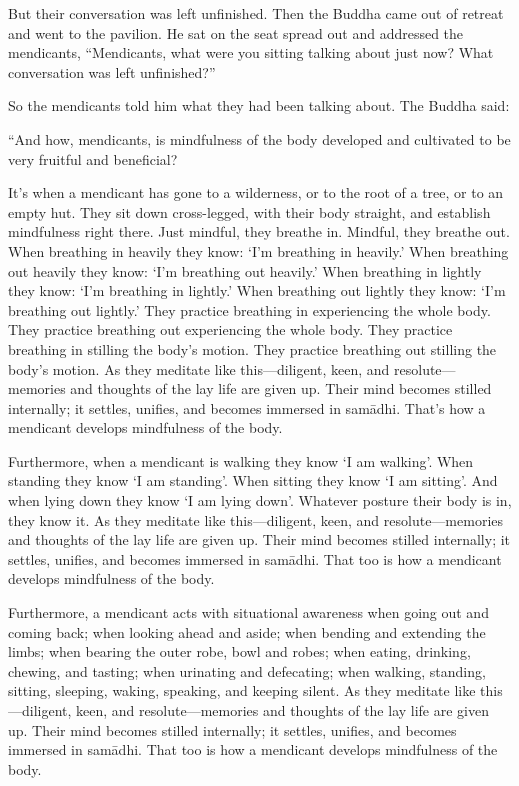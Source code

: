 \documentclass[12pt,openany]{book}%
\begin{document}
But their conversation was left unfinished. Then the Buddha came out of retreat and went to the pavilion. He sat on the seat spread out and addressed the mendicants, “Mendicants, what were you sitting talking about just now? What conversation was left unfinished?” 

So the mendicants told him what they had been talking about. The Buddha said: 

“And how, mendicants, is mindfulness of the body developed and cultivated to be very fruitful and beneficial? 

It’s when a mendicant has gone to a wilderness, or to the root of a tree, or to an empty hut. They sit down cross-legged, with their body straight, and establish mindfulness right there. Just mindful, they breathe in. Mindful, they breathe out. When breathing in heavily they know: ‘I’m breathing in heavily.’ When breathing out heavily they know: ‘I’m breathing out heavily.’ When breathing in lightly they know: ‘I’m breathing in lightly.’ When breathing out lightly they know: ‘I’m breathing out lightly.’ They practice breathing in experiencing the whole body. They practice breathing out experiencing the whole body. They practice breathing in stilling the body’s motion. They practice breathing out stilling the body’s motion. As they meditate like this—diligent, keen, and resolute—memories and thoughts of the lay life are given up. Their mind becomes stilled internally; it settles, unifies, and becomes immersed in \textsanskrit{samādhi}. That’s how a mendicant develops mindfulness of the body. 

Furthermore, when a mendicant is walking they know ‘I am walking’. When standing they know ‘I am standing’. When sitting they know ‘I am sitting’. And when lying down they know ‘I am lying down’. Whatever posture their body is in, they know it. As they meditate like this—diligent, keen, and resolute—memories and thoughts of the lay life are given up. Their mind becomes stilled internally; it settles, unifies, and becomes immersed in \textsanskrit{samādhi}. That too is how a mendicant develops mindfulness of the body. 

Furthermore, a mendicant acts with situational awareness when going out and coming back; when looking ahead and aside; when bending and extending the limbs; when bearing the outer robe, bowl and robes; when eating, drinking, chewing, and tasting; when urinating and defecating; when walking, standing, sitting, sleeping, waking, speaking, and keeping silent. As they meditate like this—diligent, keen, and resolute—memories and thoughts of the lay life are given up. Their mind becomes stilled internally; it settles, unifies, and becomes immersed in \textsanskrit{samādhi}. That too is how a mendicant develops mindfulness of the body. 
\end{document}
